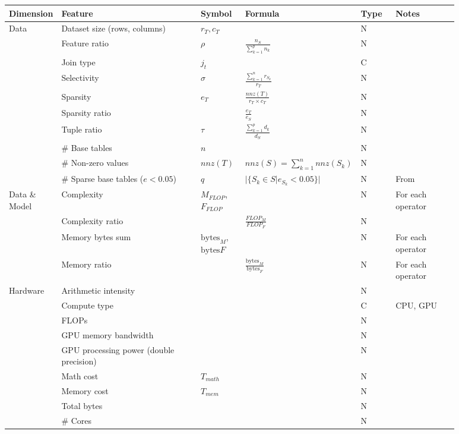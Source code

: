 \begin{tabular}{lp{0.35\linewidth}p{0.10\linewidth}>{\footnotesize}p{0.2\linewidth}p{0.08\linewidth}p{0.15\linewidth}}
\toprule
Dimension & Feature & Symbol & Formula & Type & Notes \\
\midrule\midrule
\multirow[t]{10}{*}{Data} & Dataset size (rows, columns) & $r_T, c_T$ &  & N &  \\
 & Feature ratio & $\rho$ & $\frac{n_S}{\sum_{k=1}^p n_k} $ & N &  \\
 & Join type & $j_t$ &  & C &  \\
 & Selectivity & $\sigma$ & $\frac{\sum_{k=1}^{n}r_{S_k}}{r_T}$ & N &  \\
 & Sparsity & $e_T$ & $\frac{nnz(T)}{r_T\times c_T}$ & N &  \\
 & Sparsity ratio &  & $\frac{e_T}{e_S}$ & N &  \\
 & Tuple ratio & $\tau$ & $\frac{\sum_{k=1}^p d_k}{d_S}$ & N &  \\
 & \# Base tables & $n$ &  & N &  \\
 & \# Non-zero values & $nnz(T)$ & $nnz(S) = \sum_{k=1}^{n}nnz(S_k)$ & N &  \\
 & \# Sparse base tables ($e < 0.05$) & $q$ & $|\{S_k \in S| e_{S_k} < 0.05\}|$ & N & From \cite{MorpheusFI} \\

\multirow[t]{4}{*}{Data \& Model} & Complexity  & $M_{FLOP}$, $F_{FLOP}$ &  & N & For each operator \\
 & Complexity ratio &  & $\frac{FLOP_M}{FLOP_F}$ & N &  \\
 & Memory bytes sum & $\text{bytes}_M$, $\text{bytes}F$ &  & N & For each operator \\
 & Memory ratio &  & $\frac{\text{bytes}_M}{\text{bytes}_F}$ & N & For each operator \\

\multirow[t]{9}{*}{Hardware} & Arithmetic intensity &  &  & N &  \\
 & Compute type &  &  & C & CPU, GPU \\
 & FLOPs &  &  & N &  \\
 & GPU memory bandwidth &  &  & N &  \\
 & GPU processing power (double precision) &  &  & N &  \\
 & Math cost & $T_{math}$ &  & N &  \\
 & Memory cost & $T_{mem}$ &  & N &  \\
 & Total bytes &  &  & N &  \\
 & \# Cores &  &  & N &  \\


\end{tabular}
